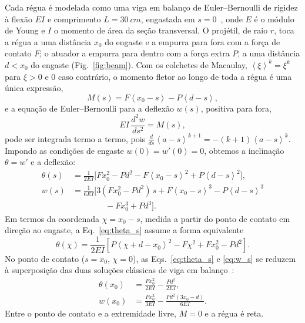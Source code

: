 \documentclass[aps,pre,twocolumn,superscriptaddress,nofootinbib,floatfix]{revtex4-2}
\newcommand{\mac}[1]{\left\langle #1 \right\rangle}
\begin{document}
Cada régua é modelada como uma viga em balanço de Euler--Bernoulli de rigidez à flexão $EI$ e comprimento $L=\SI{30}{cm}$, engastada em $s=0$~\cite{timoshenko1972,gere2009}, onde $E$ é o módulo de Young e $I$ o momento de área da seção transversal. O projétil, de raio $r$, toca a régua a uma distância $x_0$ do engaste e a empurra para fora com a força de contato $F$; o atuador a empurra para dentro com a força extra $P$, a uma distância $d<x_0$ do engaste (Fig.~\ref{fig:beam}). Com os colchetes de Macaulay, $\mac{\xi}^k=\xi^k$ para $\xi>0$ e $0$ caso contrário, o momento fletor ao longo de toda a régua é uma única expressão,
\begin{equation}
  M(s) = F\mac{x_0-s} - P\mac{d-s},
  \label{eq:moment}
\end{equation}
e a equação de Euler--Bernoulli para a deflexão $w(s)$, positiva para fora,
\begin{equation}
  EI\,\frac{d^2w}{ds^2} = M(s),
  \label{eq:eb}
\end{equation}
pode ser integrada termo a termo, pois $\frac{d}{ds}\mac{a-s}^{k+1}=-(k+1)\mac{a-s}^{k}$. Impondo as condições de engaste $w(0)=w'(0)=0$, obtemos a inclinação $\theta=w'$ e a deflexão:
\begin{align}
  \theta(s) &= \frac{1}{2EI}\Big[Fx_0^2 - Pd^2 - F\mac{x_0-s}^2 + P\mac{d-s}^2\Big],
  \label{eq:theta_s}\\
  w(s) &= \frac{1}{6EI}\Big[3(Fx_0^2-Pd^2)\,s + F\mac{x_0-s}^3 - P\mac{d-s}^3 \nonumber\\
  &\qquad\qquad - Fx_0^3 + Pd^3\Big].
  \label{eq:w_s}
\end{align}
Em termos da coordenada $\chi=x_0-s$, medida a partir do ponto de contato em direção ao engaste, a Eq.~\eqref{eq:theta_s} assume a forma equivalente
\begin{equation}
  \theta(\chi) = \frac{1}{2EI}\left[P\mac{\chi+d-x_0}^2 - F\chi^2 + Fx_0^2 - Pd^2\right].
  \label{eq:theta_chi}
\end{equation}
No ponto de contato ($s=x_0$, $\chi=0$), as Eqs.~\eqref{eq:theta_s} e \eqref{eq:w_s} se reduzem à superposição das duas soluções clássicas de viga em balanço~\cite{gere2009}:
\begin{align}
  \theta(x_0) &= \frac{Fx_0^2}{2EI} - \frac{Pd^2}{2EI}, \label{eq:theta}\\
  w(x_0) &= \frac{Fx_0^3}{3EI} - \frac{Pd^2(3x_0-d)}{6EI}. \label{eq:defl}
\end{align}
Entre o ponto de contato e a extremidade livre, $M=0$ e a régua é reta.
\end{document}
